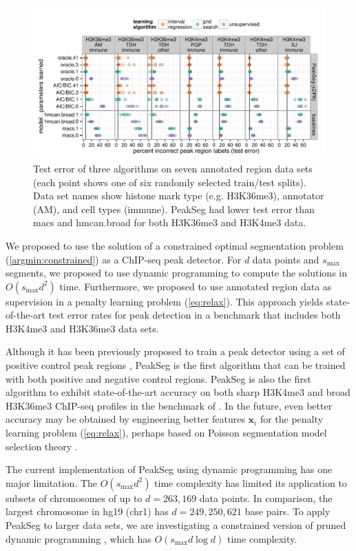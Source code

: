 \documentclass{article}
\begin{document}
\begin{figure}[t!]
  \centering
  \includegraphics[width=\textwidth]{figure-dp-peaks-regression-dots}
  \vskip -0.5cm
  \caption{Test error of three algorithms on seven annotated region
    data sets (each point shows one of six randomly selected
    train/test splits). Data set names show histone mark type
    (e.g. H3K36me3), annotator (AM), and cell types (immune). PeakSeg
    had lower test error than macs and \mbox{hmcan.broad} for both
    H3K36me3 and H3K4me3 data.}
  \label{fig:test-error}
\end{figure}

We proposed to use the solution of a constrained optimal segmentation
problem (\ref{argmin:constrained}) as a ChIP-seq peak detector. For
$d$ data points and $s_{\text{max}}$ segments, we proposed to use
dynamic programming to compute the solutions in $O(s_{\text{max}} d^2)$
time. Furthermore, we proposed to use annotated region data as
supervision in a penalty learning problem (\ref{eq:relax}). This
approach yields state-of-the-art test error rates for peak detection
in a benchmark that includes both H3K4me3 and H3K36me3 data
sets.

Although it has been previously proposed to train a peak detector
using a set of positive control peak regions \citep{DFilter}, PeakSeg
is the first algorithm that can be trained with both positive and
negative control regions. PeakSeg is also the first algorithm to
exhibit state-of-the-art accuracy on both sharp H3K4me3 and broad
H3K36me3 ChIP-seq profiles in the benchmark of
\citet{hocking2014visual}. In the future, even better accuracy may be
obtained by engineering better features $\mathbf x_i$ for the penalty
learning problem (\ref{eq:relax}), perhaps based on Poisson
segmentation model selection theory \citep{cleynen2013segmentation}.

The current implementation of PeakSeg using dynamic programming has
one major limitation. The $O(s_{\text{max}} d^2)$ time complexity has
limited its application to subsets of chromosomes of up to $d=263,169$
data points. In comparison, the largest chromosome in hg19 (chr1) has
$d=249,250,621$ base pairs. To apply PeakSeg to larger data sets, we
are investigating a constrained version of pruned dynamic programming
\citep{pruned-dp, Segmentor}, which has $O(s_{\text{max}} d\log d)$
time complexity.
\end{document}
